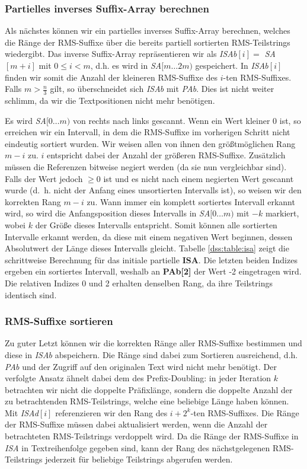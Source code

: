 \subsubsection{Partielles inverses Suffix-Array berechnen}
Als nächstes können wir ein partielles inverses Suffix-Array berechnen, welches die Ränge der RMS-Suffixe über die bereits partiell sortierten RMS-Teilstrings wiedergibt. Das inverse Suffix-Array repräsentieren wir als \textit{ISAb$[i] = $ SA $[m + i]$} mit $0 \leq i < m$, d.h. es wird in \textit{SA$[m\dots 2m)$} gespeichert. In \textit{ISAb$[i]$} finden wir somit die Anzahl der kleineren RMS-Suffixe des $i$-ten RMS-Suffixes. Falls $m > \frac{n}{3}$ gilt, so überschneidet sich \textit{ISAb} mit \textit{PAb}. Dies ist nicht weiter schlimm, da wir die Textpositionen nicht mehr benötigen.

Es wird \textit{SA$[0\dots m)$} von rechts nach links gescannt. Wenn ein Wert kleiner 0 ist, so erreichen wir ein Intervall, in dem die RMS-Suffixe im vorherigen Schritt nicht eindeutig sortiert wurden. Wir weisen allen von ihnen den größtmöglichen Rang $m-i$ zu. $i$ entspricht dabei der Anzahl der größeren RMS-Suffixe. Zusätzlich müssen die Referenzen bitweise negiert werden (da sie nun \glqq vergleichbar\grqq{} sind). Falls der Wert jedoch $\geq 0$ ist und es nicht nach einem negierten Wert gescannt wurde (d.~h. nicht der Anfang eines unsortierten Intervalls ist), so weisen wir den korrekten Rang $m-i$ zu. Wann immer ein komplett sortiertes Intervall erkannt wird, so wird die Anfangsposition dieses Intervalls in \textit{SA$[0\dots m)$} mit $-k$ markiert, wobei $k$ der Größe dieses Intervalls entspricht. Somit können alle sortierten Intervalle erkannt werden, da diese mit einem negativen Wert beginnen, dessen Absolutwert der Länge dieses Intervalls gleicht. Tabelle \ref{dss:table:isa} zeigt die schrittweise Berechnung für das initiale partielle \textbf{ISA}. Die letzten beiden Indizes ergeben ein sortiertes Intervall, weshalb an \textbf{PAb[2]} der Wert -2 eingetragen wird. Die relativen Indizes 0 und 2 erhalten denselben Rang, da ihre Teilstrings identisch sind.


\subsubsection{RMS-Suffixe sortieren}
Zu guter Letzt können wir die korrekten Ränge aller RMS-Suffixe bestimmen und diese in \textit{ISAb} abspeichern. Die Ränge sind dabei zum Sortieren ausreichend, d.h. \textit{PAb} und der Zugriff auf den originalen Text wird nicht mehr benötigt. Der verfolgte Ansatz ähnelt dabei dem des Prefix-Doubling: in jeder Iteration $k$ betrachten wir nicht die doppelte Präfixlänge, sondern die doppelte Anzahl der zu betrachtenden RMS-Teilstrings, welche eine beliebige Länge haben können. Mit \textit{ISAd$[i]$} referenzieren wir den Rang des $i + 2^k$-ten RMS-Suffixes. Die Ränge der RMS-Suffixe müssen dabei aktualisiert werden, wenn die Anzahl der betrachteten RMS-Teilstrings verdoppelt wird. Da die Ränge der RMS-Suffixe in \textit{ISA} in Textreihenfolge gegeben sind, kann der Rang des nächstgelegenen RMS-Teilstrings jederzeit für beliebige Teilstrings abgerufen werden.

